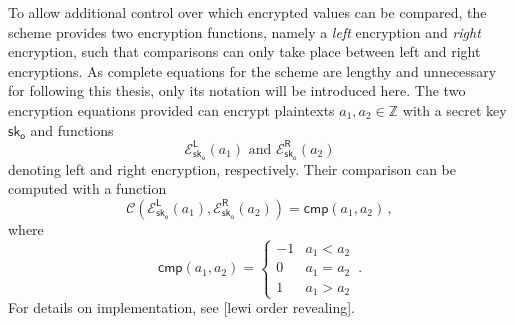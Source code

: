 To allow additional control over which encrypted values can be compared, the scheme provides two encryption functions, namely a \textit{left} encryption and \textit{right} encryption, such that comparisons can only take place between left and right encryptions. As complete equations for the scheme are lengthy and unnecessary for following this thesis, only its notation will be introduced here. The two encryption equations provided can encrypt plaintexts $a_1,a_2\in\mathbb{Z}$ with a secret key $\mathsf{sk}_{\mathsf{o}}$ and functions
\begin{equation}\label{eq:prelims:lewi_enc}
    \mathcal{E}^{\mathsf{L}}_{\mathsf{sk}_{\mathsf{o}}}\left(a_1\right)\text{ and }\mathcal{E}^{\mathsf{R}}_{\mathsf{sk}_{\mathsf{o}}}\left(a_2\right)
\end{equation}
denoting left and right encryption, respectively. Their comparison can be computed with a function
\begin{equation}\label{eq:prelims:lewi_comp}
    \mathcal{C}\left(\mathcal{E}^{\mathsf{L}}_{\mathsf{sk}_{\mathsf{o}}}(a_1), \mathcal{E}^{\mathsf{R}}_{\mathsf{sk}_{\mathsf{o}}}(a_2)\right) = \mathsf{cmp}(a_1, a_2)\,,
\end{equation}
where
\begin{equation*}
    \mathsf{cmp}(a_1, a_2)=
    \begin{cases}
        -1 & a_1 < a_2\\
        0 & a_1 = a_2\\
        1 & a_1 > a_2
    \end{cases}\,.
\end{equation*}
For details on implementation, see [lewi order revealing].

% 
% 

